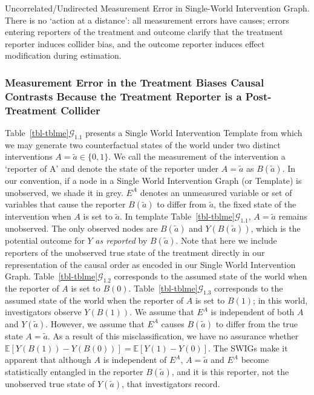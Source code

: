 \documentclass[
  single column]{article}
\begin{document}
\begin{table}

\caption{\label{tbl-tblme}Uncorrelated/Undirected Measurement Error in
Single-World Intervention Graph. There is no `action at a distance': all
measurement errors have causes; errors entering reporters of the
treatment and outcome clarify that the treatment reporter induces
collider bias, and the outcome reporter induces effect modification
during estimation.}

\centering{

\tblme

}

\end{table}%

\subsubsection{Measurement Error in the Treatment Biases Causal
Contrasts Because the Treatment Reporter is a Post-Treatment
Collider}\label{measurement-error-in-the-treatment-biases-causal-contrasts-because-the-treatment-reporter-is-a-post-treatment-collider}

Table~\ref{tbl-tblme}\(\mathcal{G}_{1.1}\) presents a Single World
Intervention Template from which we may generate two counterfactual
states of the world under two distinct interventions
\(A = \tilde{a} \in \{0,1\}\). We call the measurement of the
intervention a `reporter of A' and denote the state of the reporter
under \(A = \tilde{a}\) as \(B(\tilde{a})\). In our convention, if a
node in a Single World Intervention Graph (or Template) is unobserved,
we shade it in grey. \(E^A\) denotes an unmeasured variable or set of
variables that cause the reporter \(B(\tilde{a})\) to differ from
\(\tilde{a}\), the fixed state of the intervention when \(A\) is set to
\(\tilde{a}\). In template Table~\ref{tbl-tblme}\(\mathcal{G}_{1.1}\),
\(A = \tilde{a}\) remains unobserved. The only observed nodes are
\(B(\tilde{a})\) and \(Y(B(\tilde{a}))\), which is the potential outcome
for \(Y\) \emph{as reported} by \(B(\tilde{a})\). Note that here we
include reporters of the unobserved true state of the treatment directly
in our representation of the causal order as encoded in our Single World
Intervention Graph. Table~\ref{tbl-tblme}\(\mathcal{G}_{1.2}\)
corresponds to the assumed state of the world when the reporter of \(A\)
is set to \(B(0)\). Table~\ref{tbl-tblme}\(\mathcal{G}_{1.3}\)
corresponds to the assumed state of the world when the reporter of \(A\)
is set to \(B(1)\); in this world, investigators observe \(Y(B(1))\). We
assume that \(E^A\) is independent of both \(A\) and \(Y(\tilde{a})\).
However, we assume that \(E^A\) causes \(B(\tilde{a})\) to differ from
the true state \(A=\tilde{a}\). As a result of this misclassification,
we have no assurance whether
\(\mathbb{E}[Y(B(1)) - Y(B(0))] = \mathbb{E}[Y(1) - Y(0)]\). The SWIGs
make it apparent that although \(A\) is independent of \(E^A\),
\(A = \tilde{a}\) and \(E^A\) become statistically entangled in the
reporter \(B(\tilde{a})\), and it is this reporter, not the unobserved
true state of \(Y(\tilde{a})\), that investigators record.
\end{document}
